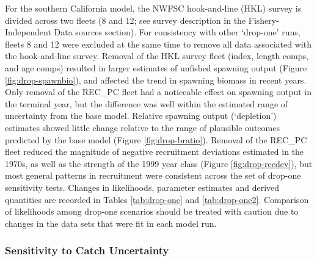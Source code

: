 \documentclass[11pt,
  english,
  a4paper,
]{article}
\begin{document}
For the southern California model, the NWFSC hook-and-line (HKL) survey is divided across two fleets (8 and 12; see survey description in the Fishery-Independent Data sources section). For consistency with other `drop-one' runs, fleets 8 and 12 were excluded at the same time to remove all data associated with the hook-and-line survey. Removal of the HKL survey fleet (index, length comps, and age comps) resulted in larger estimates of unfished spawning output (Figure \ref{fig:drop-spawnbio}), and affected the trend in spawning biomass in recent years. Only removal of the REC\_PC fleet had a noticeable effect on spawning output in the terminal year, but the difference was well within the estimated range of uncertainty from the base model. Relative spawning output (`depletion') estimates showed little change relative to the range of plausible outcomes predicted by the base model (Figure \ref{fig:drop-bratio}). Removal of the REC\_PC fleet reduced the magnitude of negative recruitment deviations estimated in the 1970s, as well as the strength of the 1999 year class (Figure \ref{fig:drop-recdev}), but most general patterns in recruitment were consistent across the set of drop-one sensitivity tests. Changes in likelihoods, parameter estimates and derived quantities are recorded in Tables \ref{tab:drop-one} and \ref{tab:drop-one2}. Comparison of likelihoods among drop-one scenarios should be treated with caution due to changes in the data sets that were fit in each model run.


\hypertarget{sensitivity-to-catch-uncertainty}{%
\subsubsection{Sensitivity to Catch Uncertainty}\label{sensitivity-to-catch-uncertainty}}

\leavevmode\tagmcend\tagstructend
\end{document}
